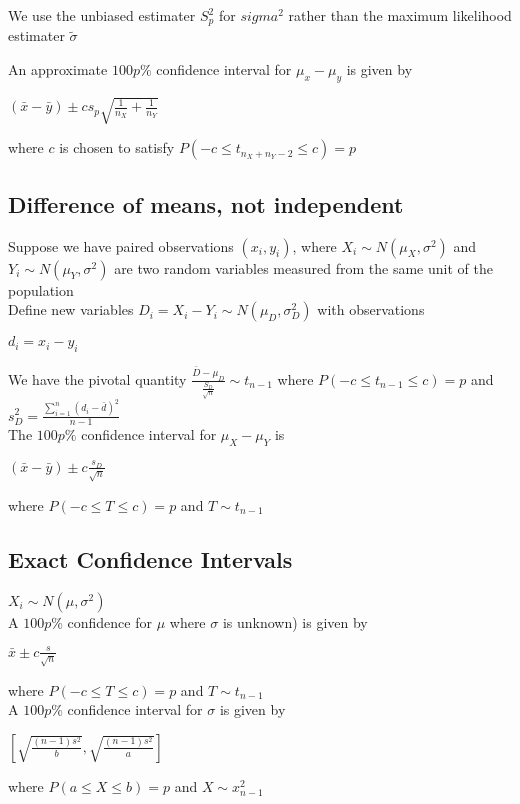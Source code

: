 \documentclass[12pt]{report}
\begin{document}
        We use the unbiased estimater $S^2_p$ for $sigma^2$ rather than the maximum likelihood estimater $\widetilde{\sigma}$

        An approximate $100p\%$ confidence interval for $\mu_x - \mu_y$ is given by
        \begin{center}$(\bar{x} - \bar{y}) \pm cs_p\sqrt{\frac{1}{n_X} + \frac{1}{n_Y}}$\end{center}
          where $c$ is chosen to satisfy $P(-c \leq t_{n_X + n_Y - 2} \leq c) = p$

    \subsection{Difference of means, not independent}
    Suppose we have paired observations $(x_i, y_i)$, where $X_i \sim N(\mu_X, \sigma^2)$ and $Y_i \sim N(\mu_Y, \sigma^2)$ are two random variables measured from the same unit of the population\\

    Define new variables $D_i = X_i - Y_i \sim N(\mu_D, \sigma^2_D)$ with observations
    \begin{center}$d_i = x_i - y_i$\end{center}

    We have the pivotal quantity $\frac{\bar{D} - \mu_D}{\frac{S_D}{\sqrt{n}}} \sim t_{n-1}$
    where $P(-c \leq t_{n-1} \leq c) = p$ and $s^2_D = \frac{\sum_{i=1}^{n}(d_i - \bar{d})^2}{n-1}$\\

    The $100p\%$ confidence interval for $\mu_X - \mu_Y$ is
    \begin{center}$(\bar{x} - \bar{y}) \pm c\frac{s_D}{\sqrt{n}}$\end{center}
      where $P(-c \leq T \leq c) = p$ and $T \sim t_{n-1}$

    \subsection{Exact Confidence Intervals}
      $X_i \sim N(\mu, \sigma^2)$\\
      A $100p\%$ confidence for $\mu$ where $\sigma$ is unknown) is given by
      \begin{center}$\bar{x} \pm c\frac{s}{\sqrt{n}}$\end{center}
      where $P(-c \leq T \leq c) = p$ and $T \sim t_{n-1}$\\

      A $100p\%$ confidence interval for $\sigma$ is given by
      \begin{center}$[ \sqrt{\frac{(n-1)s^2}{b}}, \sqrt{\frac{(n-1)s^2}{a}} ]$\end{center}
        where $P(a \leq X \leq b) = p$ and $X \sim x^2_{n-1}$
\end{document}
